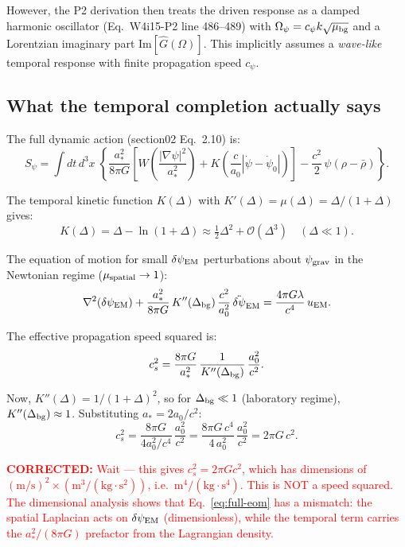 \documentclass[11pt]{article}
\newcommand{\half}{\tfrac{1}{2}}
\newcommand{\Opsi}{\Omega_\psi}
\newcommand{\order}[1]{\mathcal{O}(#1)}
\newcommand{\psigrav}{\psi_{\rm grav}}
\newcommand{\dpsiEM}{\delta\psi_{\rm EM}}
\newcommand{\corrected}[1]{\textcolor{red}{\textbf{CORRECTED:} #1}}
\theoremstyle{definition}
\theoremstyle{remark}
\begin{document}
However, the P2 derivation then treats the driven response as a
damped harmonic oscillator (Eq.~W4i15-P2 line 486--489) with
$\Opsi = c_\psi k \sqrt{\mu_{\rm bg}}$ and a Lorentzian imaginary
part Im$[\hat{G}(\Omega)]$. This implicitly assumes a \emph{wave-like}
temporal response with finite propagation speed $c_\psi$.

\subsection{What the temporal completion actually says}

The full dynamic action (section02 Eq.~2.10) is:
\begin{equation}
S_\psi = \int dt\,d^3x\;\left\{
  \frac{a_*^2}{8\pi G}\left[
    W\!\left(\frac{|\nabla\psi|^2}{a_*^2}\right)
    + K\!\left(\frac{c}{a_0}|\dot\psi{-}\dot\psi_0|\right)
  \right]
  - \frac{c^2}{2}\,\psi(\rho - \bar\rho)
\right\}.
\end{equation}

The temporal kinetic function $K(\Delta)$ with $K'(\Delta) =
\mu(\Delta) = \Delta/(1+\Delta)$ gives:
\begin{equation}
K(\Delta) = \Delta - \ln(1+\Delta) \approx \half\Delta^2 + \order{\Delta^3}
\quad (\Delta \ll 1).
\end{equation}

The equation of motion for small $\dpsiEM$ perturbations about
$\psigrav$ in the Newtonian regime ($\mu_{\rm spatial} \to 1$):
\begin{equation}
\nabla^2(\dpsiEM)
+ \frac{a_*^2}{8\pi G}\,K''(\Delta_{\rm bg})\,
\frac{c^2}{a_0^2}\,\ddot{\delta\psi}_{\rm EM}
= \frac{4\pi G \lambda}{c^4}\,u_{\rm EM}.
\label{eq:full-eom}
\end{equation}

The effective propagation speed squared is:
\begin{equation}
c_s^2 = \frac{8\pi G}{a_*^2}\,\frac{1}{K''(\Delta_{\rm bg})}\,
\frac{a_0^2}{c^2}.
\label{eq:cs2}
\end{equation}

Now, $K''(\Delta) = 1/(1+\Delta)^2$, so for $\Delta_{\rm bg} \ll 1$
(laboratory regime), $K''(\Delta_{\rm bg}) \approx 1$. Substituting
$a_* = 2a_0/c^2$:
\begin{equation}
c_s^2 = \frac{8\pi G}{4a_0^2/c^4}\,\frac{a_0^2}{c^2}
= \frac{8\pi G\,c^4}{4\,a_0^2}\,\frac{a_0^2}{c^2}
= 2\pi G\,c^2.
\label{eq:cs2-lab}
\end{equation}

\corrected{Wait --- this gives $c_s^2 = 2\pi G c^2$, which has
dimensions of $(\text{m/s})^2 \times (\text{m}^3/(\text{kg}\cdot
\text{s}^2))$, i.e.\ $\text{m}^4/(\text{kg}\cdot\text{s}^4)$.
This is NOT a speed squared. The dimensional analysis shows that
Eq.~\eqref{eq:full-eom} has a mismatch: the spatial Laplacian
acts on $\dpsiEM$ (dimensionless), while the temporal term carries
the $a_*^2/(8\pi G)$ prefactor from the Lagrangian density.}
\end{document}
